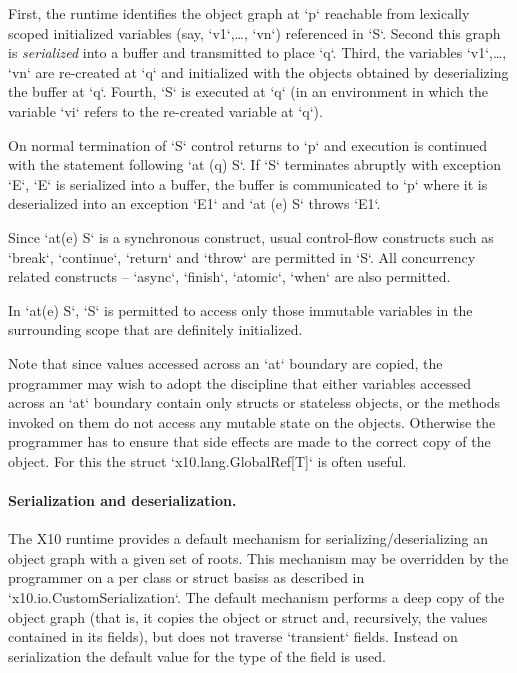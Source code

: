First, the runtime identifies the object graph at \xcd`p` reachable
from lexically scoped initialized variables (say, \xcd`v1`,\ldots,
\xcd`vn`) referenced in \xcd`S`.  Second this graph is {\em
  serialized} into a buffer and transmitted to place \xcd`q`.  Third,
the variables \xcd`v1`,\ldots, \xcd`vn` are re-created at \xcd`q` and
initialized with the objects obtained by deserializing the buffer at
\xcd`q`. Fourth, \xcd`S` is executed at \xcd`q` (in an environment in
which the variable \xcd`vi` refers to the re-created variable at
\xcd`q`).

On normal termination of \xcd`S` control returns to \xcd`p` and
execution is continued with the statement following \xcd`at (q) S`. If
\xcd`S` terminates abruptly with exception \xcd`E`, \xcd`E` is
serialized into a buffer, the buffer is communicated to \xcd`p` where
it is deserialized into an exception \xcd`E1` and \xcd`at (e) S`
throws \xcd`E1`.

Since \xcd`at(e) S` is a synchronous construct, usual control-flow
constructs such as \xcd`break`, \xcd`continue`, \xcd`return` and 
\xcd`throw` are permitted in \xcd`S`.  All concurrency related
constructs -- \xcd`async`, \xcd`finish`, \xcd`atomic`, \xcd`when` are
also permitted.

\limitationx{} In \xcd`at(e) S`, \xcd`S` is permitted to access only
those immutable variables in the surrounding scope that are definitely
initialized.

Note that since values accessed across an \xcd`at` boundary are
copied, the programmer may wish to adopt the discipline that either
variables accessed across an \xcd`at` boundary  contain only structs 
or stateless objects, or the methods invoked on them do not access any
mutable state on the objects. Otherwise the programmer has to ensure
that side effects are made to the correct copy of the object. For this
the struct \xcd`x10.lang.GlobalRef[T]` is often useful.

\paragraph{Serialization and deserialization.}
The X10 runtime provides a default mechanism for
serializing/deserializing an object graph with a given set of roots.
This mechanism may be overridden by the programmer on a per class or
struct basiss as described in \xcd`x10.io.CustomSerialization`. 
The default mechanism performs a
deep copy of the object graph (that is, it copies the object or struct
and, recursively, the values contained in its fields), but does not
traverse \xcd`transient` fields. Instead on serialization the default
value  for the type of the field is used.

